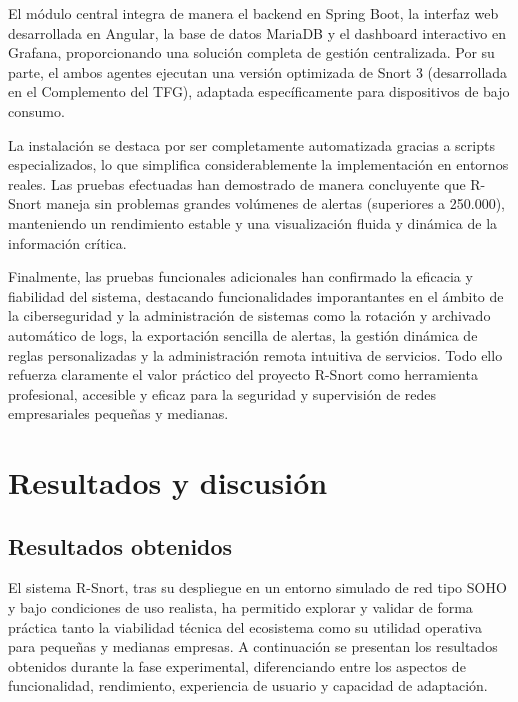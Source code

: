 \documentclass[11pt,a4paper,twoside]{report}
\begin{document}
El módulo central integra de manera el backend en Spring Boot, la interfaz web desarrollada en Angular, la base de datos MariaDB y el dashboard interactivo en Grafana, proporcionando una solución completa de gestión centralizada. Por su parte, el ambos agentes ejecutan una versión optimizada de Snort 3 (desarrollada en el Complemento del TFG), adaptada específicamente para dispositivos de bajo consumo.\newline

La instalación se destaca por ser completamente automatizada gracias a scripts especializados, lo que simplifica considerablemente la implementación en entornos reales. Las pruebas efectuadas han demostrado de manera concluyente que R-Snort maneja sin problemas grandes volúmenes de alertas (superiores a 250.000), manteniendo un rendimiento estable y una visualización fluida y dinámica de la información crítica.\newline

Finalmente, las pruebas funcionales adicionales han confirmado la eficacia y fiabilidad del sistema, destacando funcionalidades imporantantes en el ámbito de la ciberseguridad y la administración de sistemas como la rotación y archivado automático de logs, la exportación sencilla de alertas, la gestión dinámica de reglas personalizadas y la administración remota intuitiva de servicios. Todo ello refuerza claramente el valor práctico del proyecto R-Snort como herramienta profesional, accesible y eficaz para la seguridad y supervisión de redes empresariales pequeñas y medianas.

\clearpage
\null
\thispagestyle{empty}
\newpage
\chapter{Resultados y discusión}

\section{Resultados obtenidos}

El sistema R-Snort, tras su despliegue en un entorno simulado de red tipo SOHO y bajo condiciones de uso realista, ha permitido explorar y validar de forma práctica tanto la viabilidad técnica del ecosistema como su utilidad operativa para pequeñas y medianas empresas. A continuación se presentan los resultados obtenidos durante la fase experimental, diferenciando entre los aspectos de funcionalidad, rendimiento, experiencia de usuario y capacidad de adaptación.
\end{document}
